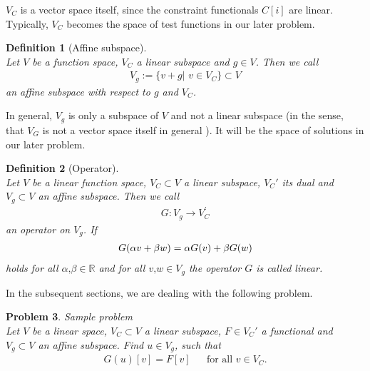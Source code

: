 \documentclass[a4paper,11pt]{article}
\numberwithin{equation}{section}
\newtheorem{definition}{Definition}[section]
\newtheorem{problem}[definition]{Problem}
\newcommand{\theoremNewline}{\hspace{1mm}\\}
\newcommand{\theoremEndLine}{\hspace{1mm}}
\newcommand{\komma}{\text{,}}
\newcommand{\R}{\mathbb{R}}
\begin{document}
    $V_C$ is a vector space itself, since the constraint functionals $C[i]$ are linear. Typically, $V_C$ becomes the
    space of test functions in our later problem.

    \begin{definition}[Affine subspace]\theoremNewline
      \label{definition::analytical_concept::affine_space}
      Let $V$ be a function space, $V_C$ a linear subspace and $g \in V$. Then we call
      \begin{align}
        V_{g} := \{ v+g| \hspace{4pt} v \in V_C \} \subset V
      \end{align}
      an \textnormal{affine subspace} with respect to $g$ and $V_C$.
    \end{definition}\theoremEndLine

    In general, $V_g$ is only a subspace of $V$ and not a linear subspace (in the sense, that $V_G$ is not a vector
    space itself in general ). It will be the space of solutions in our later problem.

    \begin{definition}[Operator]\theoremNewline
      \label{definition::analytical_concept::operator}
      Let $V$ be a linear function space, ${V_C \subset V}$ a linear subspace, $V_C'$ its dual and ${V_g \subset V}$
      an affine subspace. Then we call
      \begin{align}
        G : V_g \rightarrow V^{\prime}_C
      \end{align}
      an \textnormal{operator} on $V_g$. If
      \begin{align}
        G(\alpha v + \beta w) = \alpha G(v) + \beta G(w)
          \notag
      \end{align}
      holds for all ${\alpha\komma \beta \in \R}$ and for all ${v\komma w \in V_g}$ the operator $G$ is called
      \textnormal{linear}.
    \end{definition}

    In the subsequent sections, we are dealing with the following problem.

    \begin{problem}{Sample problem}\theoremNewline
      \label{problem::analytical_concept::sample_problem}
      Let $V$ be a linear space, ${V_C \subset V}$ a linear subspace, ${F \in V_C'}$ a functional and
      ${V_g \subset V}$ an affine subspace. Find ${u \in V_g}$, such that
      \begin{align*}
        G(u)[v] = F[v] &&\text{for all } v \in V_C.
      \end{align*}
    \end{problem}
\end{document}
